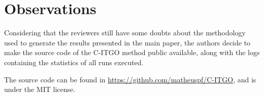 
\section*{Observations}

Considering that the reviewers still have some doubts about the methodology used to generate the results presented in the main paper, the authors decide to make the source code of the C-ITGO method public available, along with the logs containing the statistics of all runs executed.

The source code can be found in \href{https://github.com/matheuspf/C-ITGO}{https://github.com/matheuspf/C-ITGO}, and is under the MIT license.